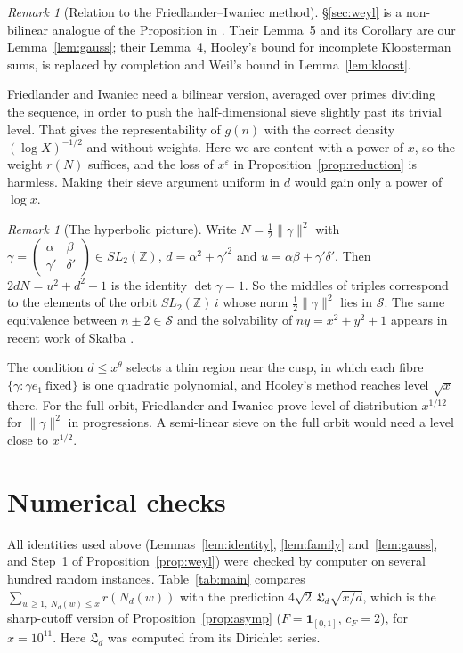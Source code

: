 \documentclass[11pt]{amsart}
\theoremstyle{remark}
\newtheorem{remark}[theorem]{Remark}
\theoremstyle{definition}
\numberwithin{equation}{section}
\newcommand{\Sc}{\mathcal{S}}
\newcommand{\Z}{\mathbb{Z}}
\newcommand{\eps}{\varepsilon}
\newcommand{\Lf}{\mathfrak{L}}
\begin{document}
\begin{remark}[Relation to the Friedlander--Iwaniec method]
\S\ref{sec:weyl} is a non-bilinear analogue of the Proposition in \cite[\S4]{FI78}. Their Lemma~5 and its Corollary are our Lemma~\ref{lem:gauss}; their Lemma~4, Hooley's bound for incomplete Kloosterman sums, is replaced by completion and Weil's bound in Lemma~\ref{lem:kloost}.

Friedlander and Iwaniec need a bilinear version, averaged over primes dividing the sequence, in order to push the half-dimensional sieve slightly past its trivial level. That gives the representability of $g(n)$ with the correct density $(\log X)^{-1/2}$ and without weights. Here we are content with a power of $x$, so the weight $r(N)$ suffices, and the loss of $x^{\eps}$ in Proposition~\ref{prop:reduction} is harmless. Making their sieve argument uniform in $d$ would gain only a power of $\log x$.
\end{remark}

\begin{remark}[The hyperbolic picture]
Write $N=\frac12\|\gamma\|^2$ with $\gamma=\left(\begin{smallmatrix}\alpha&\beta\\ \gamma'&\delta'\end{smallmatrix}\right)\in SL_2(\Z)$, $d=\alpha^2+\gamma'^2$ and $u=\alpha\beta+\gamma'\delta'$. Then $2dN=u^2+d^2+1$ is the identity $\det\gamma=1$. So the middles of triples correspond to the elements of the orbit $SL_2(\Z)\,i$ whose norm $\frac12\|\gamma\|^2$ lies in $\Sc$. The same equivalence between $n\pm2\in\Sc$ and the solvability of $ny=x^2+y^2+1$ appears in recent work of Ska{\l}ba \cite{Sk}.

The condition $d\le x^{\theta}$ selects a thin region near the cusp, in which each fibre $\{\gamma: \gamma e_1\ \text{fixed}\}$ is one quadratic polynomial, and Hooley's method reaches level $\sqrt x$ there. For the full orbit, Friedlander and Iwaniec \cite{FI09} prove level of distribution $x^{1/12}$ for $\|\gamma\|^2$ in progressions. A semi-linear sieve on the full orbit would need a level close to $x^{1/2}$.
\end{remark}

\section{Numerical checks}\label{sec:numerics}

All identities used above (Lemmas~\ref{lem:identity}, \ref{lem:family} and~\ref{lem:gauss}, and Step~1 of Proposition~\ref{prop:weyl}) were checked by computer on several hundred random instances. Table~\ref{tab:main} compares $\sum_{w\ge1,\ N_d(w)\le x}r(N_d(w))$ with the prediction $4\sqrt2\,\Lf_d\sqrt{x/d}$, which is the sharp-cutoff version of Proposition~\ref{prop:asymp} ($F=\mathbf 1_{[0,1]}$, $c_F=2$), for $x=10^{11}$. Here $\Lf_d$ was computed from its Dirichlet series.
\end{document}

